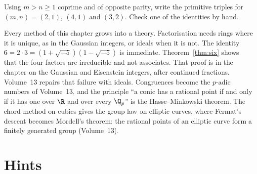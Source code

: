 \begin{exercise}[$\star$]\label{ex:t1-triple}
Using $m>n\ge 1$ coprime and of opposite parity, write the primitive triples for $(m,n)=(2,1)$, $(4,1)$ and $(3,2)$. Check one of the identities by hand.
\end{exercise}

\begin{beauty}
Every method of this chapter grows into a theory. Factorisation needs rings where it is unique, as in the Gaussian integers, or ideals when it is not. The identity $6=2\cdot3=(1+\sqrt{-5})(1-\sqrt{-5})$ is immediate. Theorem~\ref{thm:six} shows that the four factors are irreducible and not associates. That proof is in the chapter on the Gaussian and Eisenstein integers, after continued fractions. Volume~13 repairs that failure with ideals. Congruences become the $p$-adic numbers of Volume~13, and the principle ``a conic has a rational point if and only if it has one over $\R$ and over every $\Q_p$'' is the Hasse--Minkowski theorem. The chord method on cubics gives the group law on elliptic curves, where Fermat's descent becomes Mordell's theorem: the rational points of an elliptic curve form a finitely generated group (Volume~13).
\end{beauty}

\section{Hints}

